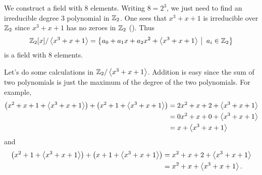 \begin{example}
    We construct a field with 8 elements. Writing $8 = 2^3$, we just need to find an irreducible degree 3 polynomial in $\mathbb{Z}_2$. One sees that $x^3 + x + 1$ is irreducible over $\mathbb{Z}_2$ since $x^3 + x + 1$ has no zeroes in $\mathbb{Z}_2$ (). Thus
    \[
        \Z_2[x]/\princ{x^3+x+1} = \left\{a_0 + a_1x + a_2x^2 + \princ{x^3+x+1} \vert a_i \in \Z_2\right\}
    \]
    is a field with 8 elements.

    Let's do some calculations in $\mathbb{Z}_2/\left\langle x^3+x+1\right\rangle$. Addition is easy since the sum of two polynomials is just the maximum of the degree of the two polynomials. For example,
    \begin{align*}
        \left(x^2 + x + 1 + \left\langle x^3 + x + 1\right\rangle\right) + \left(x^2 + 1 + \left\langle x^3 + x + 1\right\rangle\right) &= 2x^2 + x + 2 + \left\langle x^3 + x + 1\right\rangle\\
        &= 0x^2 + x + 0 + \left\langle x^3 + x + 1\right\rangle\\
        &= x + \left\langle x^3 + x + 1\right\rangle
    \end{align*}
    and
    \begin{align*}
        \left(x^2 + 1 + \left\langle x^3 + x + 1\right\rangle\right) + \left(x + 1 + \left\langle x^3 + x + 1\right\rangle\right) &= x^2 + x + 2 + \left\langle x^3 + x + 1\right\rangle\\
        &= x^2 + x + \left\langle x^3 + x + 1\right\rangle.
    \end{align*}


\end{example}
